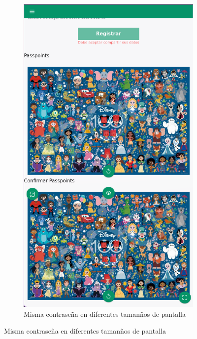 \begin{anexos}
\begin{figure}
\begin{figure}[H]
\begin{minipage}[b]{0.68\linewidth}
		\end{minipage}%
		\hfill
		\begin{minipage}[b]{0.3\linewidth} %
			\centering
			\includegraphics[width=\linewidth]{Graphics/capturas/password-mobile.png}
			
		\end{minipage}
		
		
		\caption{Misma contrase\~na en diferentes taman\~nos de pantalla }
		\label{screen-shapes-variety}
	\end{figure}
	

\end{figure}
\end{anexos}
